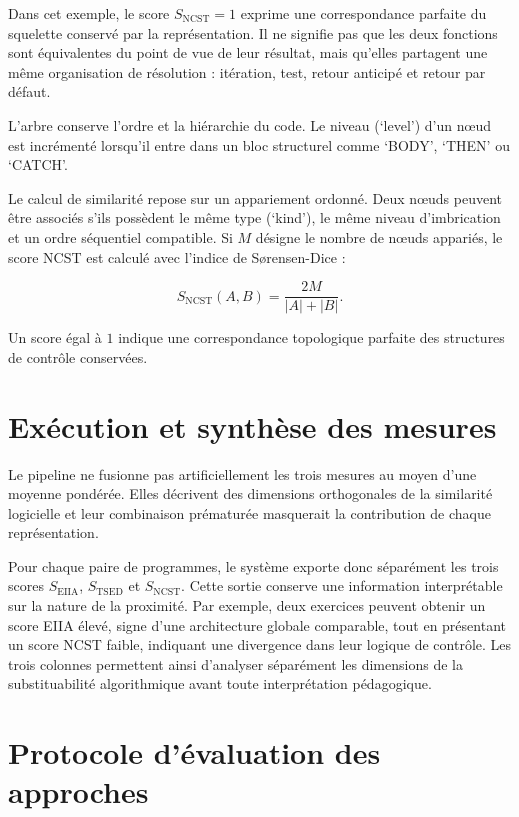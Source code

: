 Dans cet exemple, le score $S_{\mathrm{NCST}}=1$ exprime une correspondance
parfaite du squelette conservé par la représentation. Il ne signifie pas que
les deux fonctions sont équivalentes du point de vue de leur résultat, mais
qu'elles partagent une même organisation de résolution : itération, test,
retour anticipé et retour par défaut.

L'arbre conserve l'ordre et la hiérarchie du code. Le niveau (`level') d'un
nœud est incrémenté lorsqu'il entre dans un bloc structurel comme `BODY',
`THEN' ou `CATCH'.

Le calcul de similarité repose sur un appariement ordonné. Deux nœuds peuvent
être associés s'ils possèdent le même type (`kind'), le même niveau
d'imbrication et un ordre séquentiel compatible. Si $M$ désigne le nombre de
nœuds appariés, le score NCST est calculé avec l'indice de Sørensen-Dice :

\begin{equation}
S_{\mathrm{NCST}}(A,B) =
\frac{2M}{|A|+|B|}.
\end{equation}

Un score égal à $1$ indique une correspondance topologique parfaite des
structures de contrôle conservées.

\section{Exécution et synthèse des mesures}

Le pipeline ne fusionne pas artificiellement les trois mesures au moyen d'une
moyenne pondérée. Elles décrivent des dimensions orthogonales de la
similarité logicielle et leur combinaison prématurée masquerait la
contribution de chaque représentation.

Pour chaque paire de programmes, le système exporte donc séparément les trois
scores $S_{\mathrm{EIIA}}$, $S_{\mathrm{TSED}}$ et $S_{\mathrm{NCST}}$. Cette
sortie conserve une information interprétable sur la nature de la proximité.
Par exemple, deux exercices peuvent obtenir un score EIIA élevé, signe d'une
architecture globale comparable, tout en présentant un score NCST faible,
indiquant une divergence dans leur logique de contrôle. Les trois colonnes
permettent ainsi d'analyser séparément les dimensions de la substituabilité
algorithmique avant toute interprétation pédagogique.

\section{Protocole d'évaluation des approches}

